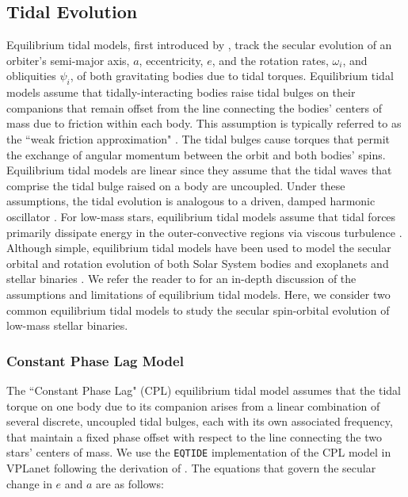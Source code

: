 \documentclass[twocolumn]{aastex61}
\newcommand{\eqtide}[0]{\texttt{EQTIDE}\xspace}
\begin{document}
\subsection{Tidal Evolution} \label{sec:methods:eqtide}

 Equilibrium tidal models, first introduced by \citet{Darwin1880}, track the secular evolution of an orbiter's semi-major axis, $a$, eccentricity, $e$, and the rotation rates, $\omega_i$, and obliquities $\psi_i$, of both gravitating bodies due to tidal torques. Equilibrium tidal models assume that tidally-interacting bodies raise tidal bulges on their companions that remain offset from the line connecting the bodies' centers of mass due to friction within each body. This assumption is typically referred to as the ``weak friction approximation" \citep{Zahn2008}.  The tidal bulges cause torques that permit the exchange of angular momentum between the orbit and both bodies' spins. Equilibrium tidal models are linear since they assume that the tidal waves that comprise the tidal bulge raised on a body are uncoupled. Under these assumptions, the tidal evolution is analogous to a driven, damped harmonic oscillator \citep{Greenberg2009}. For low-mass stars, equilibrium tidal models assume that tidal forces primarily dissipate energy in the outer-convective regions via viscous turbulence \citep[see][]{Zahn2008}. Although simple, equilibrium tidal models have been used to model the secular orbital and rotation evolution of both Solar System bodies and exoplanets \citep[e.g.][]{Goldreich1966,Jackson2009,Leconte2010,Heller2011,Barnes2013,Barnes2017} and stellar binaries \citep[e.g.][]{Zahn1989,Zahn2008,Khaliullin2011,Repetto2014,Fleming2018}. We refer the reader to \citet{Barnes2017} for an in-depth discussion of the assumptions and limitations of equilibrium tidal models. Here, we consider two common equilibrium tidal models to study the secular spin-orbital evolution of low-mass stellar binaries.  

\subsubsection{Constant Phase Lag Model}

The ``Constant Phase Lag" (CPL) \citep[][]{FerrazMello2008,Heller2011} equilibrium tidal model assumes that the tidal torque on one body due to its companion arises from a linear combination of several discrete, uncoupled tidal bulges, each with its own associated frequency, that maintain a fixed phase offset with respect to the line connecting the two stars' centers of mass. We use the \eqtide implementation of the CPL model in VPLanet following the derivation of \citet{FerrazMello2008}.  The equations that govern the secular change in $e$ and $a$ are as follows:
\end{document}
